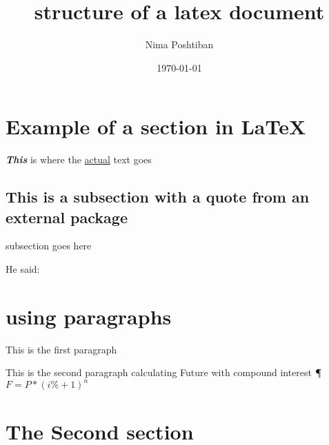 \documentclass{article}
\title{structure of a latex document}
\author{Nima Poshtiban}
\date{\today} %
\begin{document}
\maketitle

\tableofcontents
\section{Example of a section in \LaTeX}
\textbf{\textit{This}} is where the \underline{actual} text goes

\subsection{This is a subsection with a quote from an external package}
subsection goes here

He said: 

\section{using paragraphs}

This is the first paragraph
\par This is the second paragraph \newline
calculating Future with compound interest \newline
$\mathparagraph$ $F=P*\left(i\%+1\right)^{n}$
\section{The Second section}
\blindtext %
\end{document}
